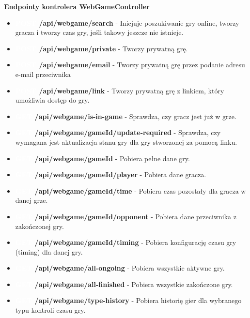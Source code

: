 \documentclass[twoside]{projektInzynierskiMS1}
\begin{document}
\newpage

\noindent  \textbf{Endpointy kontrolera WebGameController}
\begin{itemize} 
    \setlength\itemsep{0cm}
    \item \textbf{\colorbox{green!90}{\textcolor{white}{POST}} /api/webgame/search} - Inicjuje poszukiwanie gry online, tworzy gracza i tworzy czas gry, jeśli takowy jeszcze nie istnieje. 
    \item \textbf{\colorbox{green!90}{\textcolor{white}{POST}} /api/webgame/private} - Tworzy prywatną grę. 
    \item \textbf{\colorbox{green!90}{\textcolor{white}{POST}} /api/webgame/email} - Tworzy prywatną grę przez podanie adresu e-mail przeciwnika 
    \item \textbf{\colorbox{green!90}{\textcolor{white}{POST}} /api/webgame/link} - Tworzy prywatną grę z linkiem, który umożliwia dostęp do gry.
    \item \textbf{\colorbox{cyan!90}{\textcolor{white}{GET}} /api/webgame/is-in-game} - Sprawdza, czy gracz jest już w grze. 
    \item \textbf{\colorbox{cyan!90}{\textcolor{white}{GET}} /api/webgame/{gameId}/update-required} - Sprawdza, czy wymagana jest aktualizacja stanu gry dla gry stworzonej za pomocą linku. 
    \item \textbf{\colorbox{cyan!90}{\textcolor{white}{GET}} /api/webgame/{gameId}} - Pobiera pełne dane gry. 
    \item \textbf{\colorbox{cyan!90}{\textcolor{white}{GET}} /api/webgame/{gameId}/player} - Pobiera dane gracza. 
    \item \textbf{\colorbox{cyan!90}{\textcolor{white}{GET}} /api/webgame/{gameId}/time} - Pobiera czas pozostały dla gracza w danej grze. 
    \item \textbf{\colorbox{cyan!90}{\textcolor{white}{GET}} /api/webgame/{gameId}/opponent} - Pobiera dane przeciwnika z zakończonej gry. 
    \item \textbf{\colorbox{cyan!90}{\textcolor{white}{GET}} /api/webgame/{gameId}/timing} - Pobiera konfigurację czasu gry (timing) dla danej gry. 
    \item \textbf{\colorbox{cyan!90}{\textcolor{white}{GET}} /api/webgame/all-ongoing} - Pobiera wszystkie aktywne gry. 
    \item \textbf{\colorbox{cyan!90}{\textcolor{white}{GET}} /api/webgame/all-finished} - Pobiera wszystkie zakończone gry. 
    \item \textbf{\colorbox{cyan!90}{\textcolor{white}{GET}} /api/webgame/type-history} - Pobiera historię gier dla wybranego typu kontroli czasu gry. 

\end{itemize}
\end{document}
